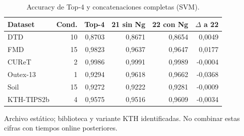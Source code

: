\begin{table}[!htbp]\centering
\fontsize{9}{11}\selectfont\setlength{\tabcolsep}{4pt}
\caption{Accuracy de Top-4 y concatenaciones completas (SVM).}\label{tab:tm-top4-svm}
\begin{tabular}{@{}lrrrrr@{}}\toprule
Dataset & Cond. & Top-4 & 21 sin Ng & 22 con Ng & $\Delta$ a 22\\\midrule
DTD & 10 & 0,8703 & 0,8671 & 0,8654 & 0,0049\\
FMD & 15 & 0,9823 & 0,9637 & 0,9647 & 0,0177\\
CUReT & 2 & 0,9986 & 0,9991 & 0,9989 & -0,0004\\
Outex-13 & 1 & 0,9294 & 0,9618 & 0,9662 & -0,0368\\
Soil & 15 & 0,9272 & 0,9222 & 0,9281 & -0,0009\\
KTH-TIPS2b & 4 & 0,9575 & 0,9516 & 0,9609 & -0,0034\\
\bottomrule\end{tabular}
\par\smallskip\begin{minipage}{0.98\textwidth}\footnotesize Archivo estático; biblioteca y variante KTH identificadas. No combinar estas cifras con tiempos online posteriores.\end{minipage}
\end{table}
